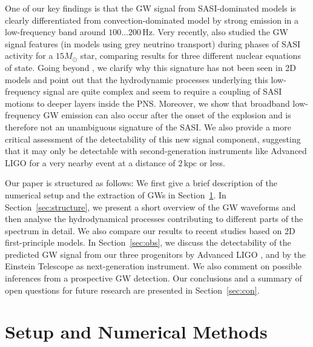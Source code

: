 One of our key findings is that the GW signal 
from SASI-dominated models is clearly differentiated from convection-dominated model 
by strong emission in a low-frequency band around $100 \ldots 200 \, \mathrm{Hz}$. 
Very recently, \cite{kuroda_16} also studied the GW signal 
features (in models using grey neutrino transport) during phases of SASI activity for a $15 M_\odot$ star,
comparing results for three different nuclear equations of state. Going beyond \cite{kuroda_16}, we clarify why this 
signature has not been seen in 2D models and point out that the hydrodynamic processes underlying 
this low-frequency signal are quite complex and seem to require a coupling of SASI motions to deeper 
layers inside the PNS. Moreover, we show that broadband low-frequency GW emission 
can also occur after the onset of the explosion and is therefore not an unambiguous signature of 
the SASI. We also provide a more critical assessment of the detectability of this new signal component, 
suggesting that it may only be detectable with second-generation instruments like Advanced LIGO for a very 
nearby event at a distance of $2 \, \mathrm{kpc}$ or less.

Our paper is structured as follows: We first give a brief
description of the numerical setup and the extraction of
GWs in Section~\ref{sec:numerics}.
In Section~\ref{sec:structure}, we present a short overview
of the GW waveforms and then analyse the hydrodynamical
processes contributing to different parts of the spectrum
in detail. We also compare our results to recent studies
based on 2D first-principle models.
In Section~\ref{sec:obs}, we discuss the detectability
of the predicted GW signal from our
three progenitors by Advanced LIGO \citep{advligo_15},
and by the Einstein Telescope \citep{et_12} as next-generation
instrument. We also comment on possible inferences
from a prospective GW detection. Our
conclusions and a summary of open questions for
future research are presented in Section~\ref{sec:con}.
\section{Setup and Numerical Methods}
\label{sec:numerics}

